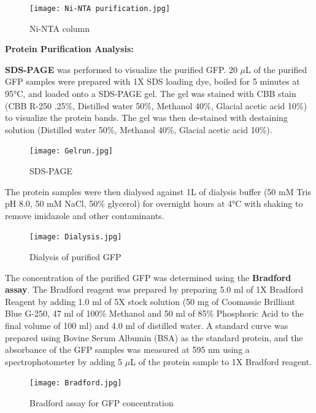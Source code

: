\documentclass[twoside]{article}
\begin{document}
\begin{multicols}{2}
\begin{figure}[H]
    \centering
    \texttt{[image: Ni-NTA purification.jpg]}
    \caption{Ni-NTA column}
    \label{fig:Ni-NTA_column}
\end{figure}



\textbf{Protein Purification Analysis:}

\textbf{SDS-PAGE} was performed to visualize the purified GFP. 
20 $\mu$L of the purified GFP samples were prepared with 1X SDS loading dye, boiled for 5 minutes at 95°C, and loaded onto a SDS-PAGE gel.
The gel was stained with CBB stain (CBB R-250 .25\%, Distilled water 50\%, Methanol 40\%, Glacial acetic acid 10\%) to visualize the protein bands.
The gel was then de-stained with destaining solution (Distilled water 50\%, Methanol 40\%, Glacial acetic acid 10\%).

\begin{figure}[H]
    \centering
    \texttt{[image: Gelrun.jpg]}
    \caption{SDS-PAGE}
    \label{fig:SDS-PAGE}  
\end{figure}


The protein samples were then dialysed against 1L of dialysis buffer (50 mM Tris pH 8.0, 50 mM NaCl, 50\% glycerol) for overnight 
hours at 4°C with shaking to remove imidazole and other contaminants.

\begin{figure}[H]
    \centering
    \texttt{[image: Dialysis.jpg]}
    \caption{Dialysis of purified GFP}
    \label{fig:Dialysis}
\end{figure}

The concentration of the purified GFP was determined using the \textbf{Bradford assay}.
The Bradford reagent was prepared by preparing 5.0 ml of 1X Bradford Reagent by adding 1.0 ml of 5X stock solution (50 mg of 
Coomassie Brilliant Blue G-250, 47 ml of 100\% Methanol and 50 ml of 85\% Phosphoric Acid to the final volume of 100 ml) and 4.0 ml of distilled water.
A standard curve was prepared using Bovine Serum Albumin (BSA) as the standard protein, 
and the absorbance of the GFP samples was measured at 595 nm using a spectrophotometer by adding 5 $\mu$L
of the protein sample to 1X Bradford reagent.

\begin{figure}[H]
    \centering
    \texttt{[image: Bradford.jpg]}
    \caption{Bradford assay for GFP concentration}
    \label{fig:Bradford_assay}
\end{figure}


\end{multicols}
\end{document}
